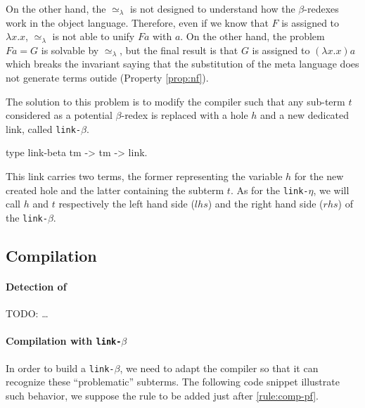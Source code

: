 \documentclass[sigconf,natbib=false,review]{acmart}
\newcommand{\UnifRel}{\ensuremath{\simeq}}
\newcommand{\Ue}{\ensuremath{\UnifRel_\lambda}\xspace}
\newcommand{\linkbeta}{\texttt{link-}\ensuremath{\beta}\xspace}
\newcommand{\linketa}{\texttt{link-}\ensuremath{\eta}\xspace}
\newcommand{\lhs}{\ensuremath{\mathrm{lhs}}\xspace}
\newcommand{\rhs}{\ensuremath{\mathrm{rhs}}\xspace}
\begin{document}
On the other hand, the \Ue is not designed to understand how the $\beta$-redexes
work in the object language. Therefore, even if we know that $F$ is assigned
to $\lambda x.x$, \Ue is not able to unify $F a$ with $a$. On the other hand,
the problem $F a = G$ is solvable by \Ue, but the final result is that $G$ is
assigned to $(\lambda x.x) a$ which breaks the invariant saying that the
substitution of the meta language does not generate terms outide \wellb{} (Property \ref{prop:nf}).

The solution to this problem is to modify the compiler such that any sub-term $t$
considered as a potential $\beta$-redex is replaced with a hole $h$ and a new dedicated
link, called \linkbeta.

\begin{elpicode}
  type link-beta tm -> tm -> link.
\end{elpicode}

\def\rhs{\ensuremath{rhs}\xspace}
\def\lhs{\ensuremath{lhs}\xspace}

This link carries two terms, the former representing the variable $h$ for the
new created hole and the latter containing the subterm $t$. As for the \linketa,
we will call $h$ and $t$ respectively the left hand side (\lhs)
and the right hand side (\rhs) of the \linkbeta.

\subsection{Compilation}

\paragraph{Detection of \maybebeta} TODO: \dots

\paragraph{Compilation with \linkbeta}

In order to build a \linkbeta, we need to adapt the compiler so that it can
recognize these ``problematic'' subterms. The following code snippet illustrate
such behavior, we suppose the rule to be added just after \cref{rule:comp-pf}.


\end{document}

